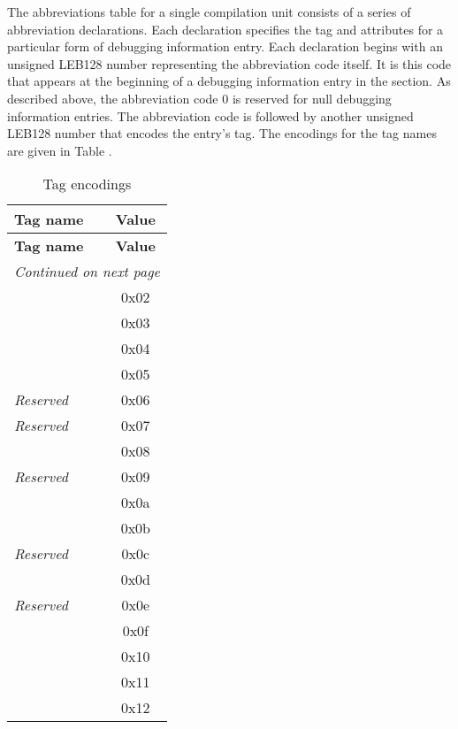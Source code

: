 The abbreviations table for a single compilation unit consists
of a series of abbreviation declarations. Each declaration
specifies the tag and attributes for a particular form of
debugging information entry. Each declaration begins with
an unsigned LEB128
number representing the abbreviation
code itself. It is this code that appears at the beginning
of a debugging information entry in the 
\dotdebuginfo{}
section. As described above, the abbreviation
code 0 is reserved for null debugging information entries. The
abbreviation code is followed by another unsigned LEB128
number that encodes the entry\textquoteright s tag. The encodings for the
tag names are given in 
Table .

\begin{centering}
\setlength{\extrarowheight}{0.1cm}
\begin{longtable}{l|c}
  \caption{Tag encodings} \label{tab:tagencodings} \\
  \hline \bfseries Tag name&\bfseries Value\\ \hline
\endfirsthead
  \bfseries Tag name&\bfseries Value \\ \hline
\endhead
  \hline 
  \multicolumn{2}{l}{\emph{Continued on next page}}
\endfoot
  \hline 
\endlastfoot
\DWTAGarraytype{} 			&0x01 \\
\DWTAGclasstype				&0x02 \\
\DWTAGentrypoint			&0x03 \\
\DWTAGenumerationtype		&0x04 \\
\DWTAGformalparameter		&0x05 \\
\textit{Reserved}			&0x06 \\
\textit{Reserved}			&0x07 \\
\DWTAGimporteddeclaration	&0x08 \\
\textit{Reserved}			&0x09 \\
\DWTAGlabel					&0x0a \\
\DWTAGlexicalblock			&0x0b \\
\textit{Reserved}			&0x0c \\
\DWTAGmember				&0x0d \\
\textit{Reserved}			&0x0e \\
\DWTAGpointertype			&0x0f \\
\DWTAGreferencetype			&0x10 \\
\DWTAGcompileunit			&0x11 \\
\DWTAGstringtype			&0x12 \\

\end{longtable}
\end{centering}
